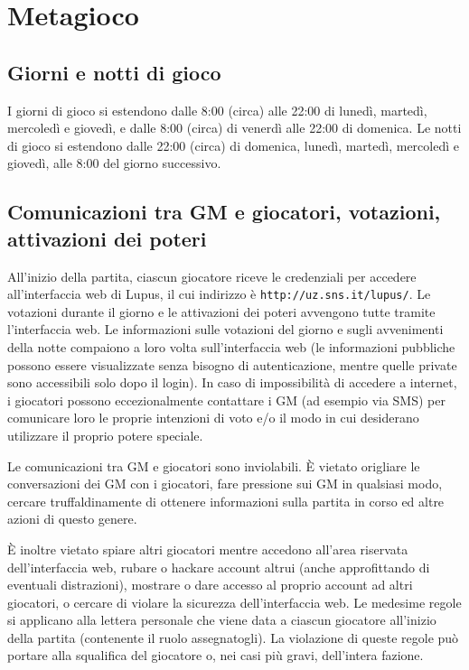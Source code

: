\documentclass[a4paper,10pt]{article}
\begin{document}
\pagebreak
\section{Metagioco}

\subsection{Giorni e notti di gioco}

I giorni di gioco si estendono dalle 8:00 (circa) alle 22:00 di lunedì, martedì,
mercoledì e giovedì, e dalle 8:00 (circa) di venerdì alle 22:00 di domenica.
Le notti di gioco si estendono dalle 22:00 (circa) di domenica, lunedì, martedì, mercoledì e giovedì,
alle 8:00 del giorno successivo.



\subsection{Comunicazioni tra GM e giocatori, votazioni, attivazioni dei poteri}

All'inizio della partita, ciascun giocatore riceve le credenziali per accedere
all'interfaccia web di Lupus, il cui indirizzo è
\verb|http://uz.sns.it/lupus/|.
Le votazioni durante il giorno e le attivazioni dei poteri avvengono tutte
tramite l'interfaccia web. Le informazioni sulle votazioni del giorno e sugli
avvenimenti della notte compaiono a loro volta sull'interfaccia web (le
informazioni pubbliche possono essere visualizzate senza bisogno di
autenticazione, mentre quelle private sono accessibili solo dopo il login).
In caso di impossibilità di accedere a internet, i giocatori possono
eccezionalmente contattare i GM (ad esempio via SMS) per comunicare loro le proprie
intenzioni di voto e/o il modo in cui desiderano utilizzare il proprio potere
speciale.

Le comunicazioni tra GM e giocatori sono inviolabili. È vietato origliare le
conversazioni dei GM con i giocatori, fare pressione sui GM in qualsiasi modo,
cercare truffaldinamente di ottenere informazioni sulla partita in corso ed altre azioni di
questo genere.

È inoltre vietato spiare altri giocatori mentre accedono all'area riservata
dell'interfaccia web, rubare o hackare account altrui (anche approfittando di
eventuali distrazioni), mostrare o dare accesso al proprio account ad altri
giocatori, o cercare di violare la sicurezza dell'interfaccia web.
Le medesime regole si applicano alla lettera personale che viene data a ciascun
giocatore all'inizio della partita (contenente il ruolo assegnatogli).
La violazione di queste regole può portare alla squalifica del giocatore o, nei
casi più gravi, dell'intera fazione.
\end{document}
